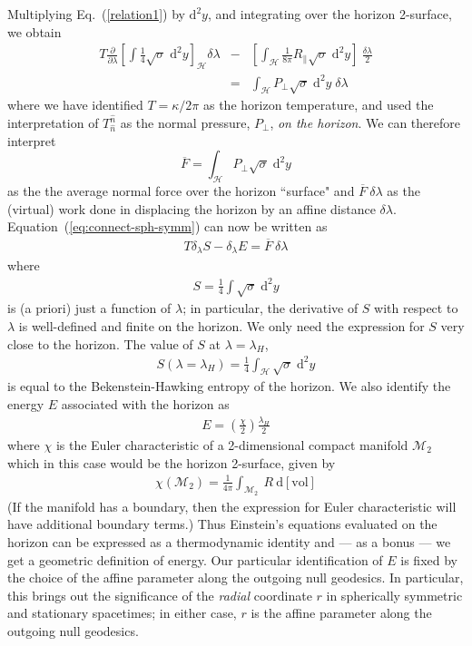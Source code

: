 \documentclass[12pt]{iopart}
\def\l{\left}
\def\r{\right}
\def\DM{\mathrm{d}}
\def\hatn{\widehat{n}}
\def\eq#1{{Eq.~(\ref{#1})}}
\begin{document}
Multiplying \eq{relation1} by ${\DM}^2 y$, and integrating over the horizon 2-surface, we  obtain
\begin{eqnarray}
T \frac{\partial}{\partial \lambda} \l[ \int \frac{1}{4} \sqrt{\sigma} \; {\DM}^2 y \r]_\mathcal{H} {\delta \lambda} &-& \l[ \int_\mathcal{H} \frac{1}{8 \pi} R_{\parallel} \sqrt{\sigma} \; {\DM}^2 y \r]~ \frac{\delta \lambda}{2}\nonumber \\
&=& \int_\mathcal{H} P_{\perp} \sqrt{\sigma} \; {\DM}^2 y \; \delta \lambda
\label{eq:connect-sph-symm}
\end{eqnarray}
where we have identified $ T = \kappa / 2 \pi $ as the horizon temperature, and used the interpretation of $T^{\hatn}_{\hatn}$ as the normal pressure, $P_{\perp}$, \textit{on the horizon}. We can therefore interpret 
\begin{equation}
\overline{F} = \int_\mathcal{H} P_{\perp} \sqrt{\sigma} \; {\DM}^2 y 
\end{equation} 
as the the average normal force over the horizon ``surface"  and $\overline{F} ~ {\delta} \lambda$ as the (virtual) work done in displacing the horizon by an affine distance ${\delta} \lambda$. Equation~(\ref{eq:connect-sph-symm}) can now be written as 
\begin{eqnarray}
T {\delta}_{\lambda} S - {\delta}_{\lambda} E = \overline{F} ~ {\delta} \lambda \label{first-law-2}
\end{eqnarray}
where 
\begin{eqnarray}
S = \frac{1}{4} \int \sqrt{\sigma} \; {\DM}^2 y
\end{eqnarray}
is (a priori) just a function of $\lambda$; in particular, the derivative of $S$ with respect to $\lambda$ is well-defined and finite on the horizon. We only need the expression for $S$ very close to the horizon. The value of $S$ at $\lambda=\lambda_H$,
\begin{eqnarray}
S\l( \lambda=\lambda_H \r) = \frac{1}{4} \int_\mathcal{H} \sqrt{\sigma} \; {\DM}^2 y
\end{eqnarray}
is equal to the Bekenstein-Hawking entropy of the horizon.  We  also identify the energy $E$ associated with the horizon as
\begin{eqnarray}
E = \l( \frac{\chi}{2} \r) \frac{\lambda_H}{2} \label{energy}
\end{eqnarray}
where $\chi$ is the Euler characteristic of a 2-dimensional compact  manifold $\mathcal{M}_2$ which in this case would be the horizon 2-surface, given by
\begin{eqnarray}
\chi \left( \mathcal{M}_2 \right) = \frac{1}{4 \pi} \int_{\mathcal{M}_2} ~ R ~ \mathrm{d[vol]}
\end{eqnarray}
(If the manifold has a boundary, then the expression for Euler characteristic will have additional boundary terms.)
Thus Einstein's equations  evaluated on the horizon  can be expressed as a thermodynamic identity and --- as a bonus --- we get a geometric definition of energy.
Our particular identification of $E$ is fixed by the choice of the affine parameter along the outgoing null geodesics. In particular, this brings out the significance of the \textit{radial} coordinate $r$ in spherically symmetric and stationary spacetimes; in either case, $r$ is the affine parameter along the outgoing null geodesics. 
\end{document}
